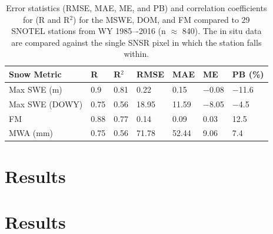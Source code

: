 \begin{table}[htbp]
  \centering
  \caption{Error statistics (RMSE, MAE, ME, and PB) and correlation coefficients for (R and R$^{2}$) for the MSWE, DOM, and FM compared to 29 SNOTEL stations from WY 1985–-2016 (n $\approx$ 840). The in situ data are compared against the single SNSR pixel in which the station falls within.}
  \label{tab:snow_metrics_val_table}
  \begin{tabular}{lllllll}
    \toprule
    Snow Metric & R & R$^{2}$ & RMSE & MAE & ME & PB (\%) \\
    \midrule
    Max SWE (m) & 0.9 & 0.81 & 0.22 & 0.15 & $-$0.08 & $-$11.6 \\
    Max SWE (DOWY) & 0.75 & 0.56 & 18.95 & 11.59 & $-$8.05 & $-$4.5 \\
    FM & 0.88 & 0.77 & 0.14 & 0.09 & 0.03 & 12.5 \\
    MWA (mm) & 0.75 & 0.56 & 71.78 & 52.44 & 9.06 & 7.4 \\
    \bottomrule
  \end{tabular}
\end{table}

\hypertarget{ch2-results}{\section{Results}\label{ch2-results}}
\hypertarget{ch2-results-1}{\section{Results}\label{ch2-results-1}}

